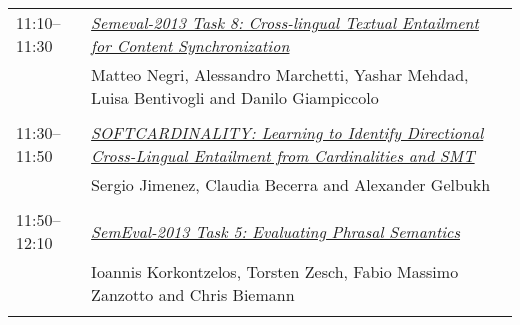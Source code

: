\begin{tabular}{p{20mm}p{128mm}}
11:10--11:30 & \hyperlink{page.25}{\em Semeval-2013 Task 8: Cross-lingual Textual Entailment for Content Synchronization}\\
         & Matteo Negri, Alessandro Marchetti, Yashar Mehdad, Luisa Bentivogli and Danilo Giampiccolo \\
\\

11:30--11:50 & \hyperlink{page.34}{\em SOFTCARDINALITY: Learning to Identify Directional Cross-Lingual Entailment from Cardinalities and SMT}\\
         & Sergio Jimenez, Claudia Becerra and Alexander Gelbukh \\
\\

11:50--12:10 & \hyperlink{page.39}{\em SemEval-2013 Task 5: Evaluating Phrasal Semantics}\\
         & Ioannis Korkontzelos, Torsten Zesch, Fabio Massimo Zanzotto and Chris Biemann \\
\\



\end{tabular}
\newpage
